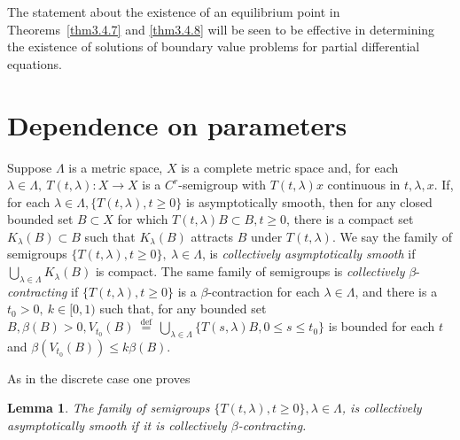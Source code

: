 \documentclass{surv-l}
\theoremstyle{plain}
\newtheorem{lemma}[theorem]{Lemma}
\theoremstyle{definition}
\numberwithin{equation}{section}
\numberwithin{figure}{chapter}
\begin{document}
The statement about the existence of an equilibrium point in Theorems~\ref{thm3.4.7} and \ref{thm3.4.8} will be seen to be effective in determining the existence of solutions of boundary value problems for partial differential equations.

\section{Dependence on parameters}\label{sec3.5}

Suppose $\Lambda$ is a metric space, $X$ is a complete metric space and, for each $\lambda \in\Lambda,\ T(t,\lambda)\!:X\rightarrow X$ is a $C^{r}$-semigroup with $T(t,\lambda)x$ continuous in $t,\lambda,x$. If, for each $\lambda \in\Lambda,\{T(t,\lambda), t\geq 0\}$ is asymptotically smooth, then for any closed bounded set $B\subset X$ for which $T(t,\lambda)B\subset B,t\geq 0$, there is a compact set $K_{\lambda}(B)\subset B$ such that $K_{\lambda}(B)$ attracts $B$ under $T(t, \lambda)$. We say the family of semigroups $\{T(t,\lambda), t\geq 0\},\ \lambda\in \Lambda$, is \emph{collectively asymptotically smooth} if $\bigcup_{\lambda\in\Lambda}K_{\lambda}(B)$ is compact. The same family of semigroups is \emph{collectively} $\beta$-\emph{contracting} if $\{T(t,\lambda),t\geq 0\}$ is a $\beta$-contraction for each $\lambda\in\Lambda$, and there is a $t_{0}>0,\ k\in[0, 1)$ such that, for any bounded set $B,\beta(B)>0,V_{t_{0}}(B)\ {\overset{\mathrm{def}}{=}}\ \bigcup_{\lambda\in\Lambda}\{T(s,\lambda)B, 0\leq s\leq t_{0}\}$ is bounded for each $t$ and $\beta(V_{t_{0}}(B))\leq k\beta(B)$.

As in the discrete case one proves

\begin{lemma}\label{lem3.5.1} The family of semigroups $\{T(t,\lambda),t\geq 0\},\lambda\in\Lambda$, is collectively asymptotically smooth if it is collectively $\beta$-contracting.
\end{lemma}
\end{document}
